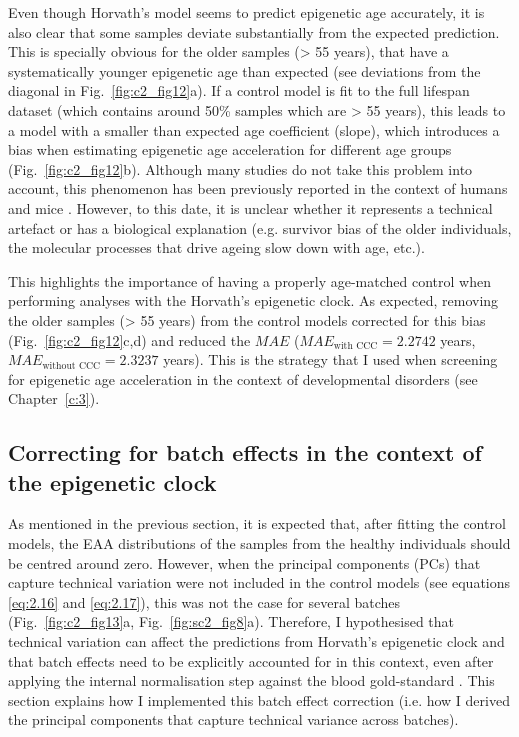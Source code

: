 \bigskip

Even though Horvath's model seems to predict epigenetic age accurately, it is also clear that some samples deviate substantially from the expected prediction. This is specially obvious for the older samples (> 55 years), that have a systematically younger epigenetic age than expected (see deviations from the diagonal in  Fig.~\ref{fig:c2_fig12}a). If a control model is fit to the full lifespan dataset (which contains around 50\% samples which are > 55 years), this leads to a model with a smaller than expected age coefficient (slope), which introduces a bias when estimating epigenetic age acceleration for different age groups (Fig.~\ref{fig:c2_fig12}b). Although many studies do not take this problem into account, this phenomenon has been previously reported in the context of humans \cite{ElKhoury2018,Marioni2018} and mice \cite{Stubbs2017}. However, to this date, it is unclear whether it represents a technical artefact or has a biological explanation (e.g. survivor bias of the older individuals, the molecular processes that drive ageing slow down with age, etc.). 

\bigskip

This highlights the importance of having a properly age-matched control when performing analyses with the Horvath's epigenetic clock. As expected, removing the older samples (> 55 years) from the control models corrected for this bias (Fig.~\ref{fig:c2_fig12}c,d) and reduced the $MAE$ ($MAE_{\text{with CCC}} = 2.2742$ years, $MAE_{\text{without CCC}} = 2.3237$ years). This is the strategy that I used when screening for epigenetic age acceleration in the context of developmental disorders (see Chapter~\ref{c:3}).

\smallskip

\subsection{Correcting for batch effects in the context of the epigenetic clock} \label{s:2.2.3}

\smallskip

As mentioned in the previous section, it is expected that, after fitting the control models, the EAA distributions of the samples from the healthy individuals should be centred around zero. However, when the principal components (\acrshort{PC}s) that capture technical variation were not included in the control models (see equations \ref{eq:2.16} and \ref{eq:2.17}), this was not the case for several batches (Fig.~\ref{fig:c2_fig13}a, Fig.~\ref{fig:sc2_fig8}a). Therefore, I hypothesised that technical variation can affect the predictions from Horvath's epigenetic clock and that batch effects need to be explicitly accounted for in this context, even after applying the internal normalisation step against the blood gold-standard \cite{Horvath2013}. This section explains how I implemented this batch effect correction (i.e. how I derived the principal components that capture technical variance across batches).

